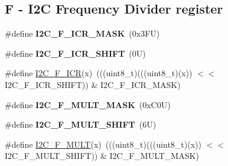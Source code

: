 \subsection*{F -\/ I2C Frequency Divider register}
\begin{DoxyCompactItemize}
\item 
\mbox{\label{group___i2_c___register___masks_gaeb777a93b5695409902fb2f2b77eb760}} 
\#define {\bfseries I2\+C\+\_\+\+F\+\_\+\+I\+C\+R\+\_\+\+M\+A\+SK}~(0x3\+F\+U)
\item 
\mbox{\label{group___i2_c___register___masks_ga8e2daf0de75e77e33467f6b132be0c30}} 
\#define {\bfseries I2\+C\+\_\+\+F\+\_\+\+I\+C\+R\+\_\+\+S\+H\+I\+FT}~(0\+U)
\item 
\#define \mbox{\hyperlink{group___i2_c___register___masks_ga18089fd1cbe1936b133d50d580d39e6d}{I2\+C\+\_\+\+F\+\_\+\+I\+CR}}(x)~(((uint8\+\_\+t)(((uint8\+\_\+t)(x)) $<$$<$ I2\+C\+\_\+\+F\+\_\+\+I\+C\+R\+\_\+\+S\+H\+I\+FT)) \& I2\+C\+\_\+\+F\+\_\+\+I\+C\+R\+\_\+\+M\+A\+SK)
\item 
\mbox{\label{group___i2_c___register___masks_ga9e077caa9ac07c03f5e34e431d0806fa}} 
\#define {\bfseries I2\+C\+\_\+\+F\+\_\+\+M\+U\+L\+T\+\_\+\+M\+A\+SK}~(0x\+C0\+U)
\item 
\mbox{\label{group___i2_c___register___masks_ga3a338cb3af4c140fde82427d091d5b4a}} 
\#define {\bfseries I2\+C\+\_\+\+F\+\_\+\+M\+U\+L\+T\+\_\+\+S\+H\+I\+FT}~(6\+U)
\item 
\#define \mbox{\hyperlink{group___i2_c___register___masks_ga8f7d596736ebbdc72c823abdc045adfd}{I2\+C\+\_\+\+F\+\_\+\+M\+U\+LT}}(x)~(((uint8\+\_\+t)(((uint8\+\_\+t)(x)) $<$$<$ I2\+C\+\_\+\+F\+\_\+\+M\+U\+L\+T\+\_\+\+S\+H\+I\+FT)) \& I2\+C\+\_\+\+F\+\_\+\+M\+U\+L\+T\+\_\+\+M\+A\+SK)
\end{DoxyCompactItemize}
